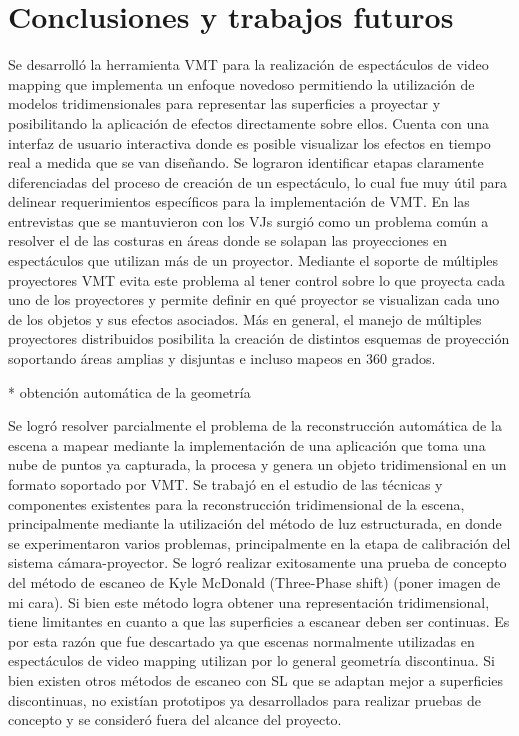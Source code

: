 ﻿\chapter{Conclusiones y trabajos futuros}

Se desarrolló la herramienta VMT para la realización de espectáculos de video mapping que implementa un enfoque novedoso permitiendo la utilización de modelos tridimensionales para representar las superficies a proyectar y posibilitando la aplicación de efectos directamente sobre ellos. Cuenta con una interfaz de usuario interactiva donde es posible visualizar los efectos en tiempo real a medida que se van diseñando.
Se lograron identificar etapas claramente diferenciadas del proceso de creación de un espectáculo, lo cual fue muy útil para delinear requerimientos específicos para la implementación de VMT. 
En las entrevistas que se mantuvieron con los VJs surgió como un problema común a resolver el de las costuras en áreas donde se solapan las proyecciones en espectáculos que utilizan más de un proyector. Mediante el soporte de múltiples proyectores VMT evita este problema al tener control sobre lo que proyecta cada uno de los proyectores y permite definir en qué proyector se visualizan cada uno de los objetos y sus efectos asociados. Más en general, el manejo de múltiples proyectores distribuidos posibilita la creación de distintos esquemas de proyección soportando áreas amplias y disjuntas e incluso mapeos en 360 grados. 

* obtención automática de la geometría

Se logró resolver parcialmente el problema de la reconstrucción automática de la escena a mapear mediante la implementación de una aplicación que toma una nube de puntos ya capturada, la procesa y genera un objeto tridimensional en un formato soportado por VMT.
Se trabajó en el estudio de las técnicas y componentes existentes para la reconstrucción tridimensional de la escena, principalmente mediante la utilización del método de luz estructurada, en donde se experimentaron varios problemas, principalmente en la etapa de calibración del sistema cámara-proyector. 
Se logró realizar exitosamente una prueba de concepto del método de escaneo de Kyle McDonald  (Three-Phase shift) (poner imagen de mi cara). Si bien este método logra obtener una representación tridimensional, tiene limitantes en cuanto a que las superficies a escanear deben ser continuas. Es por esta razón que fue descartado ya que escenas normalmente utilizadas en espectáculos de video mapping utilizan por lo general geometría discontinua.
Si bien existen otros métodos de escaneo con SL que se adaptan mejor a superficies discontinuas, no existían prototipos ya desarrollados para realizar pruebas de concepto y se consideró fuera del alcance del proyecto.



